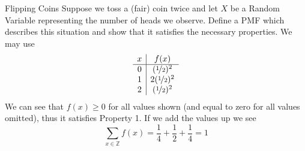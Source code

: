 \documentclass{report}
\begin{document}
\begin{example}{Flipping Coins}
    Suppose we toss a (fair) coin twice and let $X$ be a Random Variable representing the number of heads we observe. Define a PMF which describes this situation and show that it satisfies the necessary properties.
\tcblower
We may use
    \[
        \begin{array}{c|c}
            x & f(x) \\
            \hline
            0 & (\nicefrac 12)^2 \\
            1 & 2(\nicefrac 12)^2 \\
            2 & (\nicefrac 12)^2 
        \end{array}
    \]
We can see that $f(x)\ge 0$ for all values shown (and equal to zero for all values omitted), thus it satisfies Property 1. If we add the values up we see
\[
    \sum_{x\in\mathbb Z}f(x)=\frac 14 + \frac 12 + \frac 14 = 1
\]
\end{example}
\end{document}
